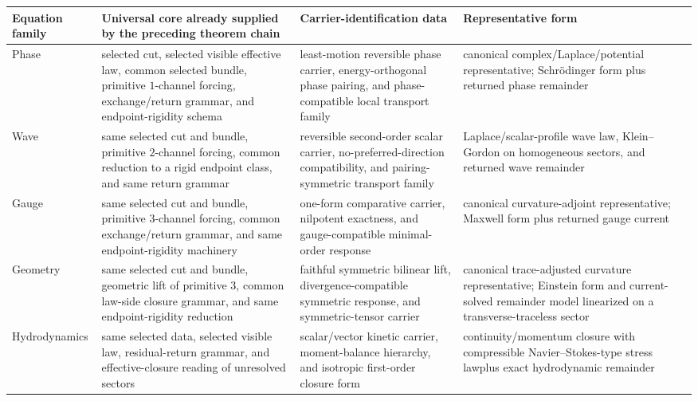 \begin{table}[ht]
\centering
\scriptsize
\renewcommand{\arraystretch}{1.15}
\setlength{\tabcolsep}{3pt}
\begin{tabular}{@{}P{1.7cm}P{4.35cm}P{4.0cm}P{4.5cm}@{}}
\toprule
\textbf{Equation family} & \textbf{Universal core already supplied by the preceding theorem chain} & \textbf{Carrier-identification data} & \textbf{Representative form} \\
\midrule
Phase
& selected cut, selected visible effective law, common selected bundle,
  primitive \(1\)-channel forcing, exchange/return grammar, and endpoint-rigidity
  schema
& least-motion reversible phase carrier, energy-orthogonal phase pairing, and
  phase-compatible local transport family
& canonical complex/Laplace/potential representative; Schr\"odinger form plus
  returned phase remainder \\

Wave
& same selected cut and bundle, primitive \(2\)-channel forcing, common
  reduction to a rigid endpoint class, and same return grammar
& reversible second-order scalar carrier, no-preferred-direction compatibility,
  and pairing-symmetric transport family
& Laplace/scalar-profile wave law, Klein--Gordon on homogeneous sectors, and
  returned wave remainder \\

Gauge
& same selected cut and bundle, primitive \(3\)-channel forcing, common
  exchange/return grammar, and same endpoint-rigidity machinery
& one-form comparative carrier, nilpotent exactness, and gauge-compatible
  minimal-order response
& canonical curvature-adjoint representative; Maxwell form plus returned
  gauge current \\

Geometry
& same selected cut and bundle, geometric lift of primitive \(3\), common
  law-side closure grammar, and same endpoint-rigidity reduction
& faithful symmetric bilinear lift, divergence-compatible symmetric response,
  and symmetric-tensor carrier
& canonical trace-adjusted curvature representative; Einstein form\newline
  and current-solved remainder model linearized on a transverse-traceless
  sector \\

Hydro\-dynamics
& same selected data, selected visible law, residual-return grammar, and
  effective-closure reading of unresolved sectors
& scalar/vector kinetic carrier, moment-balance hierarchy, and isotropic
  first-order closure form
& continuity/momentum closure with compressible
  Navier--Stokes-type stress law\newline plus exact hydrodynamic
  remainder \\


\end{tabular}
\end{table}
